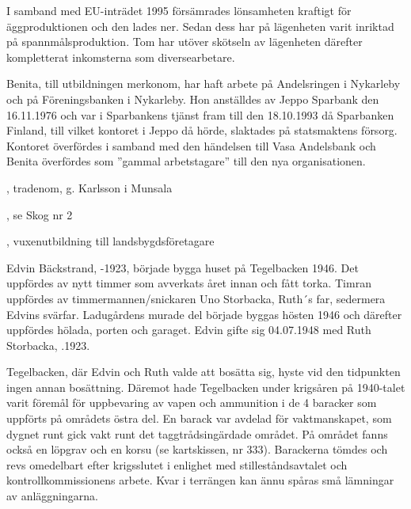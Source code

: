 I samband med EU-inträdet 1995 försämrades lönsamheten kraftigt för äggproduktionen och den lades ner. Sedan dess har på lägenheten varit inriktad på spannmålsproduktion. Tom har utöver skötseln av lägenheten därefter kompletterat inkomsterna som diversearbetare.

Benita, till utbildningen merkonom, har haft arbete på Andelsringen i Nykarleby och på Föreningsbanken i Nykarleby.  Hon anställdes av Jeppo Sparbank den 16.11.1976 och var i Sparbankens tjänst fram till den 18.10.1993 då Sparbanken Finland, till vilket kontoret i Jeppo då hörde, slaktades på statsmaktens försorg. Kontoret överfördes i samband med den händelsen till Vasa Andelsbank och Benita överfördes som ”gammal arbetstagare” till den nya organisationen.
\begin{jhchildren}
  \item {}, tradenom, g. Karlsson i Munsala
  \item {}, se Skog nr 2
  \item {}, vuxenutbildning till landsbygdsföretagare
\end{jhchildren}


Edvin Bäckstrand, -1923, började bygga huset på Tegelbacken 1946. Det uppfördes av nytt timmer som avverkats året innan och fått torka. Timran uppfördes av timmermannen/snickaren Uno Storbacka, Ruth´s far, sedermera Edvins svärfar. Ladugårdens murade del började byggas hösten 1946 och därefter uppfördes hölada, porten och garaget. Edvin gifte sig 04.07.1948 med Ruth Storbacka,  .1923.
\begin{jhchildren}
  \item {}
  \item {}
\end{jhchildren}

Tegelbacken, där Edvin och Ruth valde att bosätta sig, hyste vid den tidpunkten ingen annan bosättning. Däremot hade Tegelbacken under krigsåren på 1940-talet varit föremål för uppbevaring av vapen och ammunition i de 4 baracker som uppförts på områdets östra del. En barack var avdelad för vaktmanskapet, som dygnet runt gick vakt runt det taggtrådsingärdade området. På området fanns också en löpgrav och en korsu (se kartskissen, nr 333). Barackerna tömdes och revs omedelbart efter krigsslutet i enlighet med stilleståndsavtalet och kontrollkommissionens arbete. Kvar i terrängen kan ännu spåras små lämningar av anläggningarna.

